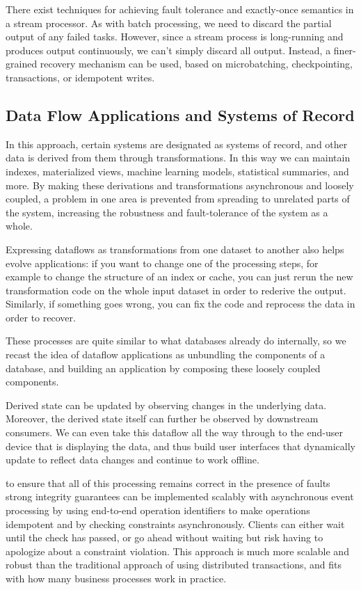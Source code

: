 \documentclass{article}
\begin{document}
    There exist techniques for achieving fault tolerance and exactly-once semantics in a stream processor. As with batch processing, we need to discard the partial output of any failed tasks. However, since a stream process is long-running and produces output continuously, we can’t simply discard all output. Instead, a finer-grained recovery mechanism can be used, based on microbatching, checkpointing, transactions, or idempotent writes.

    \subsection{Data Flow Applications and Systems of Record }
    In this approach, certain systems are designated as systems of record, and other data is derived from them through transformations. In this way we can maintain indexes, materialized views, machine learning models, statistical summaries, and more. By making these derivations and transformations asynchronous and loosely coupled, a problem in one area is prevented from spreading to unrelated parts of the system, increasing the robustness and fault-tolerance of the system as a whole.

    Expressing dataflows as transformations from one dataset to another also helps evolve applications: if you want to change one of the processing steps, for example to change the structure of an index or cache, you can just rerun the new transformation code on the whole input dataset in order to rederive the output. Similarly, if something goes wrong, you can fix the code and reprocess the data in order to recover.

    These processes are quite similar to what databases already do internally, so we recast the idea of dataflow applications as unbundling the components of a database, and building an application by composing these loosely coupled components.

    Derived state can be updated by observing changes in the underlying data. Moreover, the derived state itself can further be observed by downstream consumers. We can even take this dataflow all the way through to the end-user device that is displaying the data, and thus build user interfaces that dynamically update to reflect data changes and continue to work offline.
    
    to ensure that all of this processing remains correct in the presence of faults strong integrity guarantees can be implemented scalably with asynchronous event processing by using end-to-end operation identifiers to make operations idempotent and by checking constraints asynchronously. Clients can either wait until the check has passed, or go ahead without waiting but risk having to apologize about a constraint violation. This approach is much more scalable and robust than the traditional approach of using distributed transactions, and fits with how many business processes work in practice.
    
\end{document}
